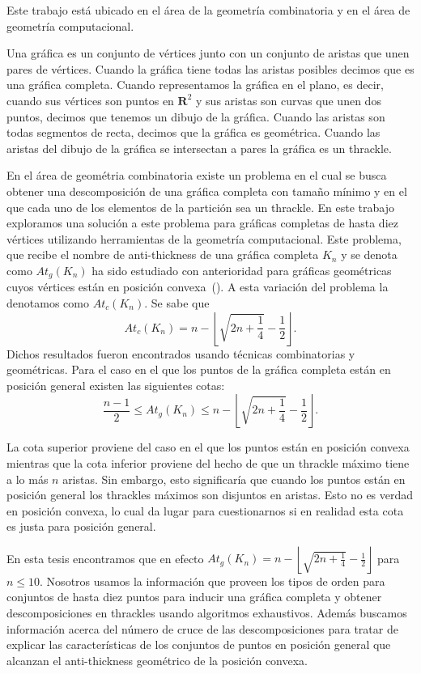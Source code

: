Este trabajo está ubicado en el área de la geometría combinatoria y en el área de
geometría computacional.

Una gráfica es un conjunto de vértices junto con un conjunto de aristas
que unen pares de vértices. Cuando la gráfica tiene todas las aristas posibles
decimos que es una gráfica completa. Cuando representamos la gráfica
en el plano, es decir, cuando sus vértices son puntos en $\mathbf{R}^2$ y sus
aristas son curvas que unen dos puntos, decimos que tenemos un dibujo de la gráfica.
Cuando las aristas son todas segmentos de recta, decimos que la gráfica es geométrica.
Cuando las aristas del dibujo de la gráfica se intersectan a pares la gráfica es un thrackle.

En el área de geométria combinatoria existe un problema en el cual se busca
obtener una descomposición de una gráfica completa con tamaño mínimo y en el
que cada uno de los elementos de la partición sea un thrackle. En este trabajo exploramos
una solución a este problema para gráficas completas de hasta diez vértices
utilizando herramientas de la geometría computacional.
Este problema, que recibe el nombre de anti-thickness de una gráfica completa $K_n$ y se denota como $At_g(K_n)$
ha sido estudiado con anterioridad para gráficas geométricas cuyos vértices están en posición convexa~(\cite{Fabila-Monroy2018}).
A esta variación del problema la denotamos como $At_c(K_n)$.
Se sabe que \[At_c(K_n) = n - \left\lfloor\sqrt{2n + \frac{1}{4}}- \frac{1}{2}\right\rfloor.\]
Dichos resultados fueron encontrados usando técnicas combinatorias y geométricas.
Para el caso en el que los puntos de la gráfica completa están
en posición general existen las siguientes cotas:
\[ \frac{n-1}{2} \leq At_g(K_n) \leq n - \left\lfloor\sqrt{2n + \frac{1}{4}}- \frac{1}{2}\right\rfloor.\]

La cota superior proviene del caso en el que los puntos están en posición convexa
mientras que la cota inferior proviene del hecho de que un thrackle máximo tiene
a lo más $n$ aristas. Sin embargo, esto significaría que cuando los puntos
están en posición general los thrackles máximos son disjuntos en aristas. Esto
no es verdad en posición convexa, lo cual da lugar para cuestionarnos si en realidad
esta cota es justa para posición general.

En esta tesis encontramos que en efecto $At_g(K_n) = n - \left\lfloor\sqrt{2n + \frac{1}{4}}- \frac{1}{2}\right\rfloor$ para $n\leq 10$.
Nosotros usamos la información que proveen los tipos de orden para conjuntos de hasta diez puntos para inducir una
gráfica completa y obtener descomposiciones en thrackles usando algoritmos exhaustivos. Además buscamos información
acerca del número de cruce de las descomposiciones para tratar de explicar las características de los conjuntos
de puntos en posición general que alcanzan el anti-thickness geométrico de la posición convexa.

